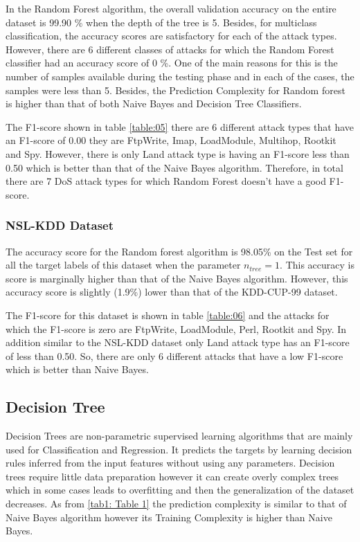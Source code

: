 \documentclass[conference]{IEEEtran}
\begin{document}
In the Random Forest algorithm, the overall validation accuracy on the entire dataset is 99.90 \% when the depth of the tree is 5. Besides, for multiclass classification, the accuracy scores are satisfactory for each of the attack types. However, there are 6 different classes of attacks for which the Random Forest classifier had an accuracy score of 0 \%. One of the main reasons for this is the number of samples available during the testing phase and in each of the cases, the samples were less than 5. Besides, the Prediction Complexity for Random forest is higher than that of both Naive Bayes and Decision Tree Classifiers. 

The F1-score shown in table \ref{table:05} there are 6 different attack types that have an F1-score of 0.00 they are FtpWrite, Imap, LoadModule, Multihop, Rootkit and Spy. However, there is only Land attack type is having an F1-score less than 0.50 which is better than that of the Naive Bayes algorithm. Therefore, in total there are 7 DoS attack types for which Random Forest doesn't have a good F1-score.  

\subsubsection{NSL-KDD Dataset}

The accuracy score for the Random forest algorithm is 98.05\% on the Test set for all the target labels of this dataset when the parameter $n_{tree} = 1$. This accuracy is score is marginally higher than that of the Naive Bayes algorithm. However, this accuracy score is slightly (1.9\%) lower than that of the KDD-CUP-99 dataset.  

The F1-score for this dataset is shown in table \ref{table:06} and the attacks for which the F1-score is zero are FtpWrite, LoadModule, Perl, Rootkit and Spy. In addition similar to the NSL-KDD dataset only Land attack type has an F1-score of less than 0.50. So, there are only 6 different attacks that have a low F1-score which is better than Naive Bayes.

\subsection{Decision Tree}
Decision Trees \cite{CART} are non-parametric supervised learning algorithms that are mainly used for Classification and Regression. It predicts the targets by learning decision rules inferred from the input features without using any parameters. Decision trees require little data preparation however it can create overly complex trees which in some cases leads to overfitting and then the generalization of the dataset decreases. As from \ref{tab1: Table 1} the prediction complexity is similar to that of Naive Bayes algorithm \cite{NB} however its Training Complexity is higher than Naive Bayes.   
\end{document}
